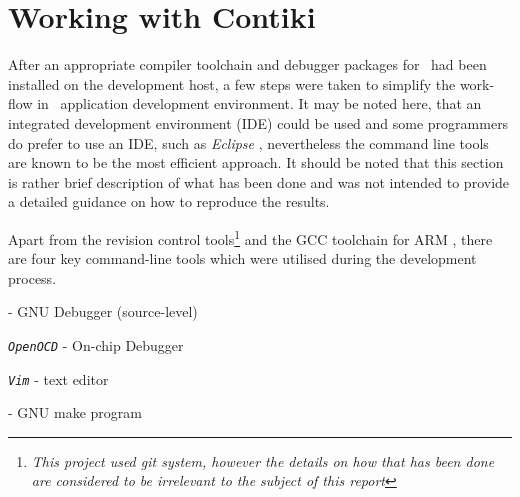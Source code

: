 \section{Working with Contiki}
  
  After an appropriate compiler toolchain and debugger packages for \MCX\
 had been installed on the development host, a few steps were taken to
 simplify the work-flow in \Contiki\ application development environment.
 It may be noted here, that an integrated development environment (IDE)
 could be used and some programmers do prefer to use an IDE, such as
 \emph{Eclipse} \cite{links:contiki:wiki:eclipse}, nevertheless the
 command line tools are known to be the most efficient approach.
 It should be noted that this section is rather brief description of what
 has been done and was not intended to provide a detailed guidance on how
 to reproduce the results.

  Apart from the revision control tools\footnote{\emph{This project used
 git system, however the details on how that has been done are considered
 to be irrelevant to the subject of this report}} and the GCC toolchain
 for ARM \cite{links:mc1322x:gcc}, there are four key command-line tools
 which were utilised during the development process.

\begin{description}
	\item {} - GNU Debugger (source-level) \cite{docs:gdb:manual}
	\item \emph{\texttt{OpenOCD}} - On-chip Debugger \cite{links:mc1322x:ocd}
	\item \emph{\texttt{Vim}} - text editor
	\item {} - GNU make program \cite{docs:make:manual}
\end{description}






